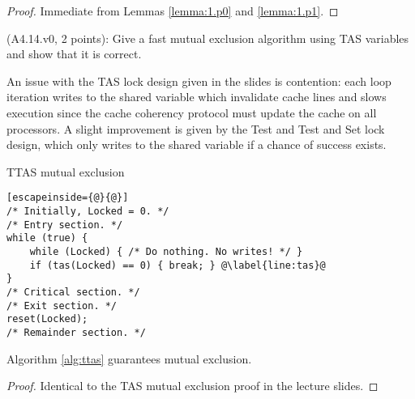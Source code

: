 \begin{proof}
Immediate from Lemmas \ref{lemma:1.p0} and \ref{lemma:1.p1}.
\end{proof}


\begin{Exc}{(A4.14.v0, 2 points):}
Give a fast mutual exclusion algorithm using TAS variables and
show that it is correct.
\end{Exc}

An issue with the TAS lock design given in the slides is contention:
each loop iteration writes to the shared variable which invalidate cache lines
and slows execution since the cache coherency protocol must update the cache
on all processors. A slight improvement is given by the Test and Test and Set
lock design, which only writes to the shared variable if a chance of success
exists.

\begin{algorithm}
\caption{TTAS mutual exclusion} \label{alg:ttas}
\begin{lstlisting}[escapeinside={@}{@}]
/* Initially, Locked = 0. */
/* Entry section. */
while (true) {
    while (Locked) { /* Do nothing. No writes! */ }
    if (tas(Locked) == 0) { break; } @\label{line:tas}@
}
/* Critical section. */
/* Exit section. */
reset(Locked);
/* Remainder section. */
\end{lstlisting}
\end{algorithm}

\begin{theorem}
Algorithm \ref{alg:ttas} guarantees mutual exclusion.
\end{theorem}

\begin{proof}
Identical to the TAS mutual exclusion proof in the lecture slides.
\end{proof}


\newcommand{\last}[1]{#1.\mathit{last}}
\newcommand{\first}[1]{#1.\mathit{first}}
\newcommand{\VV}[1]{\langle #1 \rangle}
\newcommand{\pos}{\mathit{pos}}
\newcommand{\queue}{\mathit{queue}}
\newcommand{\RMW}{\mathit{RMW}}

